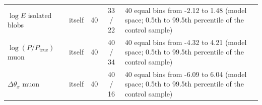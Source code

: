 \begin{tabular}{llccl}
$\log E$ isolated blobs & itself & 40 & 33 / 22 & \parbox[t]{7.5cm}{\raggedright\footnotesize 40 equal bins from -2.12 to 1.48 (model space; 0.5th to 99.5th percentile of the control sample)} \\
$\log(P/P_\mathrm{true})$ muon & itself & 40 & 40 / 34 & \parbox[t]{7.5cm}{\raggedright\footnotesize 40 equal bins from -4.32 to 4.21 (model space; 0.5th to 99.5th percentile of the control sample)} \\
$\Delta\theta_x$ muon & itself & 40 & 40 / 16 & \parbox[t]{7.5cm}{\raggedright\footnotesize 40 equal bins from -6.09 to 6.04 (model space; 0.5th to 99.5th percentile of the control sample)} \\
\bottomrule
\end{tabular}
